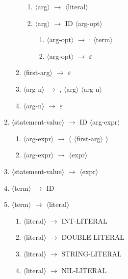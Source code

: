 \documentclass[11spt]{article}
\newcommand{\red}[1]{{\color{red} #1}}
\begin{document}
\begin{enumerate}
\begin{enumerate}
          \begin{enumerate}
                \item $\langle$arg$\rangle$ $\rightarrow$ $\langle$literal$\rangle$
                \item $\langle$arg$\rangle$ $\rightarrow$ \red{ID} $\langle$arg-opt$\rangle$
                \begin{enumerate}
                    \item $\langle$arg-opt$\rangle$ $\rightarrow$ \red{:} $\langle$term$\rangle$
                    \item $\langle$arg-opt$\rangle$ $\rightarrow$ \red{$\varepsilon$}
                \end{enumerate}
          \end{enumerate}
    \item $\langle$first-arg$\rangle$ $\rightarrow$ \red{$\varepsilon$}
    \item $\langle$arg-n$\rangle$ $\rightarrow$ \red{,} $\langle$arg$\rangle$ $\langle$arg-n$\rangle$
    \item $\langle$arg-n$\rangle$ $\rightarrow$ \red{$\varepsilon$}
\end{enumerate}
\item $\langle$statement-value$\rangle$ $\rightarrow$ \red{ID} $\langle$arg-expr$\rangle$
\begin{enumerate}
    \item $\langle$arg-expr$\rangle$ $\rightarrow$ \red{(} $\langle$first-arg$\rangle$ \red{)}
    \item $\langle$arg-expr$\rangle$ $\rightarrow$ $\langle$expr$\rangle$
\end{enumerate}
\item $\langle$statement-value$\rangle$ $\rightarrow$ $\langle$expr$\rangle$
\item $\langle$term$\rangle$ $\rightarrow$ \red{ID}
\item $\langle$term$\rangle$ $\rightarrow$ $\langle$literal$\rangle$
\begin{enumerate}
    \item $\langle$literal$\rangle$ $\rightarrow$ \red{INT-LITERAL}
    \item $\langle$literal$\rangle$ $\rightarrow$ \red{DOUBLE-LITERAL}
    \item $\langle$literal$\rangle$ $\rightarrow$ \red{STRING-LITERAL}
    \item $\langle$literal$\rangle$ $\rightarrow$ \red{NIL-LITERAL}
\end{enumerate}
\end{enumerate}
\end{document}

